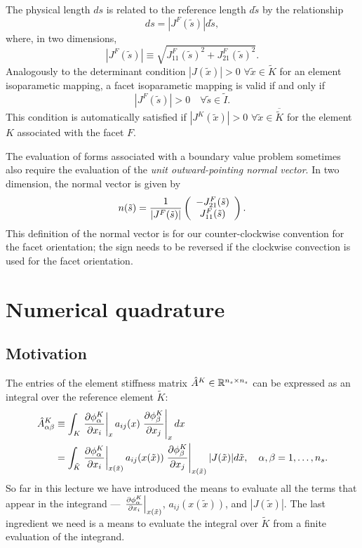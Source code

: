 The physical length $ds$ is related to the reference length $d\tilde s$ by the relationship
\begin{equation*}
  ds = |J^F(\tilde s)|d\tilde s,
\end{equation*}
where, in two dimensions, 
\begin{equation*}
  |J^F(\tilde s)| \equiv \sqrt{J^F_{11}(\tilde s)^2 + J^F_{21}(\tilde s)^2}.
\end{equation*}
Analogously to the determinant condition $|J(\tilde x)| > 0$ $\forall \tilde x \in \tilde K$ for an element isoparametic mapping, a facet isoparametic mapping is valid if and only if
\begin{equation*}
  |J^F(\tilde s)| > 0 \quad \forall \tilde s \in \tilde I.
\end{equation*}
This condition is automatically satisfied if $|J^K(\tilde x)| >0$ $\forall \tilde x \in \overline{\tilde K}$ for the element $K$ associated with the facet $F$.

The evaluation of forms associated with a boundary value problem sometimes also require the evaluation of the \emph{unit outward-pointing normal vector}. In two dimension, the normal vector is given by
\begin{equation*}
  n(\tilde s) = \frac{1}{|J^F(\tilde s)|} \bmat{c} -J^F_{21}(\tilde s) \\ J^F_{11}(\tilde s) \emat .
\end{equation*}
This definition of the normal vector is for our counter-clockwise convention for the facet orientation; the sign needs to be reversed if the clockwise convection is used for the facet orientation.

\section{Numerical quadrature}
\label{sec:fe_quad}
\subsection{Motivation}
The entries of the element stiffness matrix $\hat A^K \in \RR^{n_s \times n_s}$ can be expressed as an integral over the reference element $\tilde K$:
\begin{align*}
  \hat A^K_{\alpha\beta}
  &\equiv \int_{K} \left. \pp{\phi_\alpha^K}{x_i} \right|_{x} a_{ij}(x) \left. \pp{\phi_\beta^K}{x_j} \right|_x dx
  \\
  &= \int_{\tilde K} \left. \pp{\phi_\alpha^K}{x_i} \right|_{x(\tilde x)} a_{ij}(x(\tilde x)) \left. \pp{\phi_\beta^K}{x_j} \right|_{x(\tilde x)} |J(\tilde x)| d\tilde x , \quad \alpha,\beta = 1,\dots,n_s.
\end{align*}
So far in this lecture we have introduced the means to evaluate all the terms that appear in the integrand --- $\left. \pp{\phi_\alpha^K}{x_i} \right|_{x(\tilde x)}$, $a_{ij}(x(\tilde x))$, and $|J(\tilde x)|$.  The last ingredient we need is a means to evaluate the integral over $\tilde K$ from a finite evaluation of the integrand.

